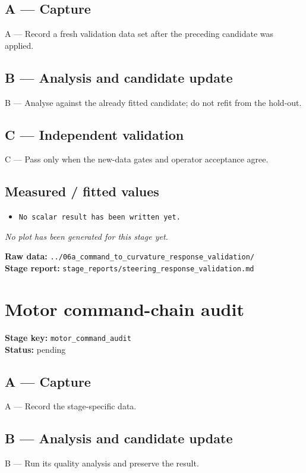 \documentclass[11pt,a4paper]{article}
\begin{document}
\subsection*{A --- Capture}
A — Record a fresh validation data set after the preceding candidate was applied.

\subsection*{B --- Analysis and candidate update}
B — Analyse against the already fitted candidate; do not refit from the hold-out.

\subsection*{C --- Independent validation}
C — Pass only when the new-data gates and operator acceptance agree.

\subsection*{Measured / fitted values}
\begin{itemize}\setlength\itemsep{0pt}
\item \texttt{No scalar result has been written yet.}
\end{itemize}

\textit{No plot has been generated for this stage yet.}

\vfill
\textbf{Raw data:} \texttt{../06a\_command\_to\_curvature\_response\_validation/}\\
\textbf{Stage report:} \texttt{stage\_reports/steering\_response\_validation.md}
\clearpage
\small
\section*{Motor command-chain audit}
\textbf{Stage key:} \texttt{motor\_command\_audit}\\
\textbf{Status:} pending\\

\subsection*{A --- Capture}
A — Record the stage-specific data.

\subsection*{B --- Analysis and candidate update}
B — Run its quality analysis and preserve the result.
\end{document}
